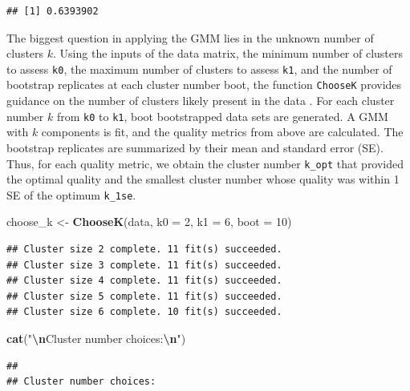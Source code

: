\documentclass[12pt]{article}
\newenvironment{Shaded}{\begin{snugshade}}{\end{snugshade}}
\newcommand{\AttributeTok}[1]{\textcolor[rgb]{0.13,0.29,0.53}{#1}}
\newcommand{\DecValTok}[1]{\textcolor[rgb]{0.00,0.00,0.81}{#1}}
\newcommand{\FunctionTok}[1]{\textcolor[rgb]{0.13,0.29,0.53}{\textbf{#1}}}
\newcommand{\NormalTok}[1]{#1}
\newcommand{\OtherTok}[1]{\textcolor[rgb]{0.56,0.35,0.01}{#1}}
\newcommand{\SpecialCharTok}[1]{\textcolor[rgb]{0.81,0.36,0.00}{\textbf{#1}}}
\newcommand{\StringTok}[1]{\textcolor[rgb]{0.31,0.60,0.02}{#1}}
\begin{document}
\begin{verbatim}
## [1] 0.6393902
\end{verbatim}

The biggest question in applying the GMM lies in the unknown number of
clusters \(k\). Using the inputs of the data matrix, the minimum number
of clusters to assess \texttt{k0}, the maximum number of clusters to
assess \texttt{k1}, and the number of bootstrap replicates at each
cluster number boot, the function \texttt{ChooseK} provides guidance on
the number of clusters likely present in the data
\citep{McCaw2019.12.20.884551}. For each cluster number \(k\) from
\texttt{k0} to \texttt{k1}, boot bootstrapped data sets are generated. A
GMM with \(k\) components is fit, and the quality metrics from above are
calculated. The bootstrap replicates are summarized by their mean and
standard error (SE). Thus, for each quality metric, we obtain the
cluster number \texttt{k\_opt} that provided the optimal quality and the
smallest cluster number whose quality was within 1 SE of the optimum
\texttt{k\_1se}.

\begin{Shaded}
\begin{Highlighting}[]
\NormalTok{choose\_k }\OtherTok{\textless{}{-}} \FunctionTok{ChooseK}\NormalTok{(data, }\AttributeTok{k0 =} \DecValTok{2}\NormalTok{, }\AttributeTok{k1 =} \DecValTok{6}\NormalTok{, }\AttributeTok{boot =} \DecValTok{10}\NormalTok{)}
\end{Highlighting}
\end{Shaded}

\begin{verbatim}
## Cluster size 2 complete. 11 fit(s) succeeded.
## Cluster size 3 complete. 11 fit(s) succeeded.
## Cluster size 4 complete. 11 fit(s) succeeded.
## Cluster size 5 complete. 11 fit(s) succeeded.
## Cluster size 6 complete. 10 fit(s) succeeded.
\end{verbatim}

\begin{Shaded}
\begin{Highlighting}[]
\FunctionTok{cat}\NormalTok{(}\StringTok{"}\SpecialCharTok{\textbackslash{}n}\StringTok{Cluster number choices:}\SpecialCharTok{\textbackslash{}n}\StringTok{"}\NormalTok{)}
\end{Highlighting}
\end{Shaded}

\begin{verbatim}
## 
## Cluster number choices:
\end{verbatim}
\end{document}
